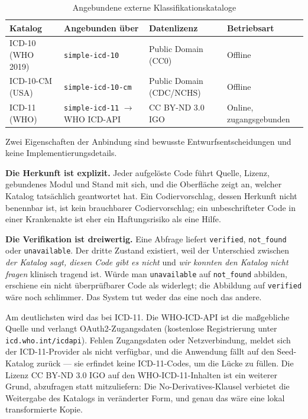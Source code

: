 \documentclass[11pt,a4paper]{article}
\begin{document}
\begin{table}[H]
\centering
\caption{Angebundene externe Klassifikationskataloge}
\label{tab:katalog-anbindung}
\footnotesize
\begin{tabularx}{\textwidth}{lXll}
\toprule
\textbf{Katalog} & \textbf{Angebunden über} & \textbf{Datenlizenz} & \textbf{Betriebsart} \\
\midrule
ICD-10 (WHO 2019) & \texttt{simple-icd-10} & Public Domain (CC0) & Offline \\
ICD-10-CM (USA) & \texttt{simple-icd-10\allowbreak-cm} & Public Domain (CDC/NCHS) & Offline \\
ICD-11 (WHO) & \texttt{simple-icd-11} $\rightarrow$ WHO ICD-API & CC BY-ND 3.0 IGO & Online, zugangsgebunden \\
\bottomrule
\end{tabularx}
\normalsize
\end{table}

Zwei Eigenschaften der Anbindung sind bewusste Entwurfsentscheidungen und keine Implementierungsdetails.

\textbf{Die Herkunft ist explizit.} Jeder aufgelöste Code führt Quelle, Lizenz, gebundenes Modul und Stand mit sich, und die Oberfläche zeigt an, welcher Katalog tatsächlich geantwortet hat. Ein Codiervorschlag, dessen Herkunft nicht benennbar ist, ist kein brauchbarer Codiervorschlag; ein unbeschrifteter Code in einer Krankenakte ist eher ein Haftungsrisiko als eine Hilfe.

\textbf{Die Verifikation ist dreiwertig.} Eine Abfrage liefert \texttt{verified}, \texttt{not\_found} oder \texttt{unavailable}. Der dritte Zustand existiert, weil der Unterschied zwischen \emph{\glqq der Katalog sagt, diesen Code gibt es nicht\grqq{}} und \emph{\glqq wir konnten den Katalog nicht fragen\grqq{}} klinisch tragend ist. Würde man \texttt{unavailable} auf \texttt{not\_found} abbilden, erschiene ein nicht überprüfbarer Code als widerlegt; die Abbildung auf \texttt{verified} wäre noch schlimmer. Das System tut weder das eine noch das andere.

Am deutlichsten wird das bei ICD-11. Die WHO-ICD-API ist die maßgebliche Quelle und verlangt OAuth2-Zugangsdaten (kostenlose Registrierung unter \texttt{icd.who.int/icdapi}). Fehlen Zugangsdaten oder Netzverbindung, meldet sich der ICD-11-Provider als nicht verfügbar, und die Anwendung fällt auf den Seed-Katalog zurück --- sie erfindet keine ICD-11-Codes, um die Lücke zu füllen. Die Lizenz CC BY-ND 3.0 IGO auf den WHO-ICD-11-Inhalten ist ein weiterer Grund, abzufragen statt mitzuliefern: Die No-Derivatives-Klausel verbietet die Weitergabe des Katalogs in veränderter Form, und genau das wäre eine lokal transformierte Kopie.
\end{document}

